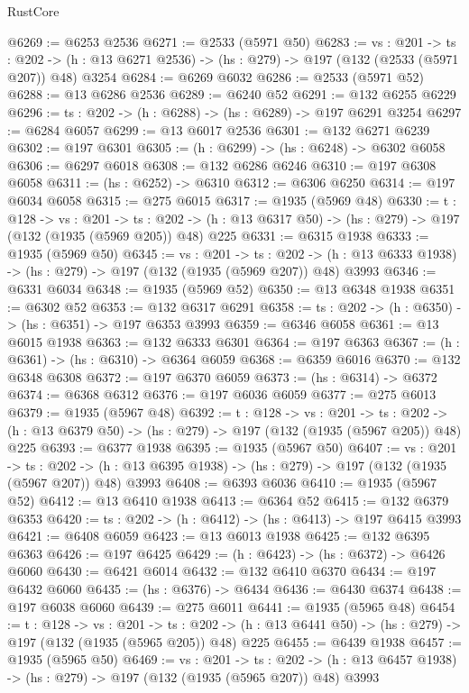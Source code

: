 \begin{lexlean}{RustCore}
\begin{coremodule}
@6269 := @6253 @2536
@6271 := @2533 (@5971 @50)
@6283 := {vs : @201} ->
  {ts : @202} -> (h : @13 @6271 @2536) -> (hs : @279) -> @197 (@132 (@2533 (@5971 @207)) @48) @3254
@6284 := @6269 @6032
@6286 := @2533 (@5971 @52)
@6288 := @13 @6286 @2536
@6289 := @6240 @52
@6291 := @132 @6255 @6229
@6296 := {ts : @202} -> (h : @6288) -> (hs : @6289) -> @197 @6291 @3254
@6297 := @6284 @6057
@6299 := @13 @6017 @2536
@6301 := @132 @6271 @6239
@6302 := @197 @6301
@6305 := (h : @6299) -> (hs : @6248) -> @6302 @6058
@6306 := @6297 @6018
@6308 := @132 @6286 @6246
@6310 := @197 @6308 @6058
@6311 := (hs : @6252) -> @6310
@6312 := @6306 @6250
@6314 := @197 @6034 @6058
@6315 := @275 @6015
@6317 := @1935 (@5969 @48)
@6330 := {t : @128} ->
  {vs : @201} ->
  {ts : @202} -> (h : @13 @6317 @50) -> (hs : @279) -> @197 (@132 (@1935 (@5969 @205)) @48) @225
@6331 := @6315 @1938
@6333 := @1935 (@5969 @50)
@6345 := {vs : @201} ->
  {ts : @202} -> (h : @13 @6333 @1938) -> (hs : @279) -> @197 (@132 (@1935 (@5969 @207)) @48) @3993
@6346 := @6331 @6034
@6348 := @1935 (@5969 @52)
@6350 := @13 @6348 @1938
@6351 := @6302 @52
@6353 := @132 @6317 @6291
@6358 := {ts : @202} -> (h : @6350) -> (hs : @6351) -> @197 @6353 @3993
@6359 := @6346 @6058
@6361 := @13 @6015 @1938
@6363 := @132 @6333 @6301
@6364 := @197 @6363
@6367 := (h : @6361) -> (hs : @6310) -> @6364 @6059
@6368 := @6359 @6016
@6370 := @132 @6348 @6308
@6372 := @197 @6370 @6059
@6373 := (hs : @6314) -> @6372
@6374 := @6368 @6312
@6376 := @197 @6036 @6059
@6377 := @275 @6013
@6379 := @1935 (@5967 @48)
@6392 := {t : @128} ->
  {vs : @201} ->
  {ts : @202} -> (h : @13 @6379 @50) -> (hs : @279) -> @197 (@132 (@1935 (@5967 @205)) @48) @225
@6393 := @6377 @1938
@6395 := @1935 (@5967 @50)
@6407 := {vs : @201} ->
  {ts : @202} -> (h : @13 @6395 @1938) -> (hs : @279) -> @197 (@132 (@1935 (@5967 @207)) @48) @3993
@6408 := @6393 @6036
@6410 := @1935 (@5967 @52)
@6412 := @13 @6410 @1938
@6413 := @6364 @52
@6415 := @132 @6379 @6353
@6420 := {ts : @202} -> (h : @6412) -> (hs : @6413) -> @197 @6415 @3993
@6421 := @6408 @6059
@6423 := @13 @6013 @1938
@6425 := @132 @6395 @6363
@6426 := @197 @6425
@6429 := (h : @6423) -> (hs : @6372) -> @6426 @6060
@6430 := @6421 @6014
@6432 := @132 @6410 @6370
@6434 := @197 @6432 @6060
@6435 := (hs : @6376) -> @6434
@6436 := @6430 @6374
@6438 := @197 @6038 @6060
@6439 := @275 @6011
@6441 := @1935 (@5965 @48)
@6454 := {t : @128} ->
  {vs : @201} ->
  {ts : @202} -> (h : @13 @6441 @50) -> (hs : @279) -> @197 (@132 (@1935 (@5965 @205)) @48) @225
@6455 := @6439 @1938
@6457 := @1935 (@5965 @50)
@6469 := {vs : @201} ->
  {ts : @202} -> (h : @13 @6457 @1938) -> (hs : @279) -> @197 (@132 (@1935 (@5965 @207)) @48) @3993

\end{coremodule}
\end{lexlean}
